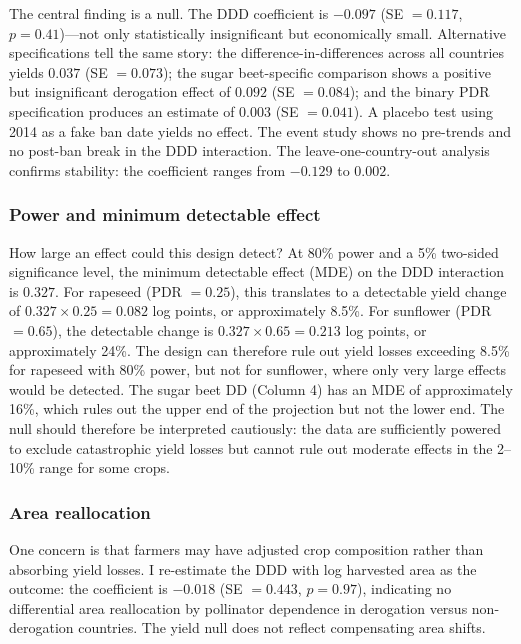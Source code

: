 \documentclass[12pt]{article}
\begin{document}
The central finding is a null. The DDD coefficient is $-0.097$ (SE $= 0.117$, $p = 0.41$)---not only statistically insignificant but economically small. Alternative specifications tell the same story: the difference-in-differences across all countries yields $0.037$ (SE $= 0.073$); the sugar beet-specific comparison shows a positive but insignificant derogation effect of $0.092$ (SE $= 0.084$); and the binary PDR specification produces an estimate of $0.003$ (SE $= 0.041$). A placebo test using 2014 as a fake ban date yields no effect. The event study shows no pre-trends and no post-ban break in the DDD interaction. The leave-one-country-out analysis confirms stability: the coefficient ranges from $-0.129$ to $0.002$.

\subsubsection*{Power and minimum detectable effect} How large an effect could this design detect? At 80\% power and a 5\% two-sided significance level, the minimum detectable effect (MDE) on the DDD interaction is $0.327$. For rapeseed (PDR $= 0.25$), this translates to a detectable yield change of $0.327 \times 0.25 = 0.082$ log points, or approximately 8.5\%. For sunflower (PDR $= 0.65$), the detectable change is $0.327 \times 0.65 = 0.213$ log points, or approximately 24\%. The design can therefore rule out yield losses exceeding 8.5\% for rapeseed with 80\% power, but not for sunflower, where only very large effects would be detected. The sugar beet DD (Column 4) has an MDE of approximately 16\%, which rules out the upper end of the \citet{bocker2016european} projection but not the lower end. The null should therefore be interpreted cautiously: the data are sufficiently powered to exclude catastrophic yield losses but cannot rule out moderate effects in the 2--10\% range for some crops.

\subsubsection*{Area reallocation} One concern is that farmers may have adjusted crop composition rather than absorbing yield losses. I re-estimate the DDD with log harvested area as the outcome: the coefficient is $-0.018$ (SE $= 0.443$, $p = 0.97$), indicating no differential area reallocation by pollinator dependence in derogation versus non-derogation countries. The yield null does not reflect compensating area shifts.
\end{document}
